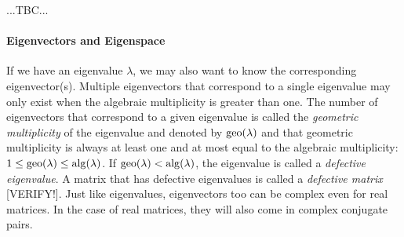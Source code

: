 ...TBC...





\paragraph{Eigenvectors and Eigenspace}
If we have an eigenvalue $\lambda$, we may also want to know the corresponding eigenvector(s). Multiple eigenvectors that correspond to a single eigenvalue may only exist when the algebraic multiplicity is greater than one. The number of eigenvectors that correspond to a given eigenvalue is called the \emph{geometric multiplicity} of the eigenvalue and denoted by $\operatorname{geo}(\lambda)$ and that geometric multiplicity is always at least one and at most equal to the algebraic multiplicity: $1 \leq \operatorname{geo}(\lambda) \leq \operatorname{alg}(\lambda)$. If $\operatorname{geo}(\lambda) < \operatorname{alg}(\lambda)$, the eigenvalue is called a \emph{defective eigenvalue}. A matrix that has defective eigenvalues is called a \emph{defective matrix} [VERIFY!]. Just like eigenvalues, eigenvectors too can be complex even for real matrices. In the case of real matrices, they will also come in complex conjugate pairs. 

